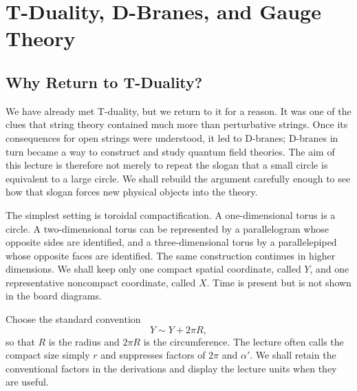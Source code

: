 \chapter{T-Duality, D-Branes, and Gauge Theory}


\section{Why Return to T-Duality?}

We have already met T-duality, but we return to it for a reason.  It was one
of the clues that string theory contained much more than perturbative
strings.  Once its consequences for open strings were understood, it led to
D-branes; D-branes in turn became a way to construct and study quantum field
theories.  The aim of this lecture is therefore not merely to repeat the
slogan that a small circle is equivalent to a large circle.  We shall rebuild
the argument carefully enough to see how that slogan forces new physical
objects into the theory.

The simplest setting is toroidal compactification.  A one-dimensional torus
is a circle.  A two-dimensional torus can be represented by a parallelogram
whose opposite sides are identified, and a three-dimensional torus by a
parallelepiped whose opposite faces are identified.  The same construction
continues in higher dimensions.  We shall keep only one compact spatial
coordinate, called \(Y\), and one representative noncompact coordinate,
called \(X\).  Time is present but is not shown in the board diagrams.

Choose the standard convention
\begin{equation}
  Y\sim Y+2\pi R,
  \label{eq:l10-circle-identification}
\end{equation}
so that \(R\) is the radius and \(2\pi R\) is the circumference.  The lecture
often calls the compact size simply \(r\) and suppresses factors of
\(2\pi\) and \(\alpha'\).  We shall retain the conventional factors in the
derivations and display the lecture units when they are useful.


